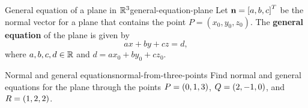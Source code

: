\begin{definition}{General equation of a plane in $\mathbb{R}^3$}{general-equation-plane}
  Let $\mbox{\bf n} = \left[a,b,c\right]^T$ be the normal vector for a plane that
  contains the point $P = (x_0, y_0, z_0)$. The \textbf{general
    equation}%
   of the plane is given by
  \[
    ax + by + cz = d,
  \]
  where $a,b,c,d \in \mathbb{R}$ and $d = ax_0 + by_0 + cz_0$.
\end{definition}

\begin{example}{Normal and general equations}{normal-from-three-points}
  Find normal and general equations for the plane through the points
  $P = \left(0,1,3\right)$, $Q=\left(2,-1,0\right)$, and $R=\left(1,2,2\right)$.
\end{example}

